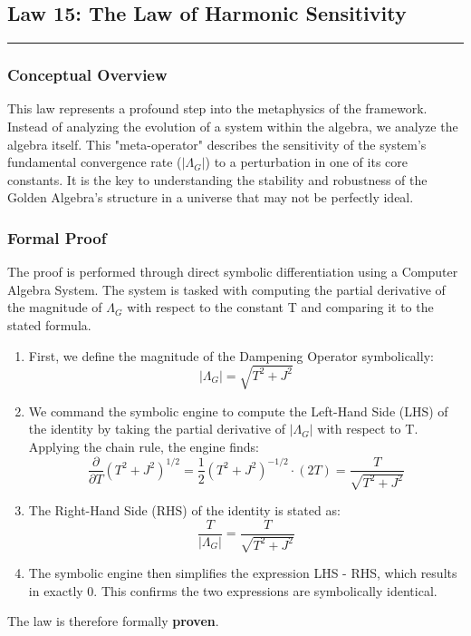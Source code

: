 \subsection*{Law 15: The Law of Harmonic Sensitivity}
\hrule
\vspace{0.3cm}
\vspace{0.5cm}

\subsubsection*{Conceptual Overview}
This law represents a profound step into the metaphysics of the framework. Instead of analyzing the evolution of a system within the algebra, we analyze the algebra itself. This "meta-operator" describes the sensitivity of the system's fundamental convergence rate ($|\Lambda_G|$) to a perturbation in one of its core constants. It is the key to understanding the stability and robustness of the Golden Algebra's structure in a universe that may not be perfectly ideal.

\subsubsection*{Formal Proof}
The proof is performed through direct symbolic differentiation using a Computer Algebra System. The system is tasked with computing the partial derivative of the magnitude of $\Lambda_G$ with respect to the constant T and comparing it to the stated formula.

\begin{enumerate}
    \item First, we define the magnitude of the Dampening Operator symbolically:
    $$ |\Lambda_G| = \sqrt{T^2 + J^2} $$
    \item We command the symbolic engine to compute the Left-Hand Side (LHS) of the identity by taking the partial derivative of $|\Lambda_G|$ with respect to T. Applying the chain rule, the engine finds:
    $$ \frac{\partial}{\partial T} (T^2 + J^2)^{1/2} = \frac{1}{2}(T^2 + J^2)^{-1/2} \cdot (2T) = \frac{T}{\sqrt{T^2 + J^2}} $$
    \item The Right-Hand Side (RHS) of the identity is stated as:
    $$ \frac{T}{|\Lambda_G|} = \frac{T}{\sqrt{T^2 + J^2}} $$
    \item The symbolic engine then simplifies the expression LHS - RHS, which results in exactly 0. This confirms the two expressions are symbolically identical.
\end{enumerate}
The law is therefore formally \textbf{proven}.

